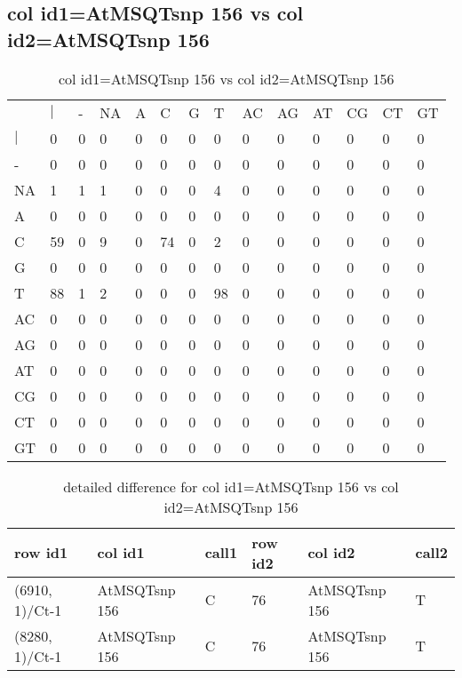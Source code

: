\subsection{col id1=AtMSQTsnp 156 vs col id2=AtMSQTsnp 156}
\begin{center}
\begin{longtable}{|l|l|l|l|l|l|l|l|l|l|l|l|l|l|}
\caption{col id1=AtMSQTsnp 156 vs col id2=AtMSQTsnp 156} \label{table_dm730}\\
\hline
\\
\hline
&$|$&-&NA&A&C&G&T&AC&AG&AT&CG&CT&GT\\
$|$&0&0&0&0&0&0&0&0&0&0&0&0&0\\
-&0&0&0&0&0&0&0&0&0&0&0&0&0\\
NA&1&1&1&0&0&0&4&0&0&0&0&0&0\\
A&0&0&0&0&0&0&0&0&0&0&0&0&0\\
C&59&0&9&0&74&0&2&0&0&0&0&0&0\\
G&0&0&0&0&0&0&0&0&0&0&0&0&0\\
T&88&1&2&0&0&0&98&0&0&0&0&0&0\\
AC&0&0&0&0&0&0&0&0&0&0&0&0&0\\
AG&0&0&0&0&0&0&0&0&0&0&0&0&0\\
AT&0&0&0&0&0&0&0&0&0&0&0&0&0\\
CG&0&0&0&0&0&0&0&0&0&0&0&0&0\\
CT&0&0&0&0&0&0&0&0&0&0&0&0&0\\
GT&0&0&0&0&0&0&0&0&0&0&0&0&0\\
\hline
\end{longtable}
\end{center}

\begin{center}
\begin{longtable}{|l|l|l|l|l|l|}
\caption{detailed difference for col id1=AtMSQTsnp 156 vs col id2=AtMSQTsnp 156} \label{table_dm731}\\
\hline
row id1&col id1&call1&row id2&col id2&call2\\
\hline
(6910, 1)/Ct-1&AtMSQTsnp 156&C&76&AtMSQTsnp 156&T\\
(8280, 1)/Ct-1&AtMSQTsnp 156&C&76&AtMSQTsnp 156&T\\
\hline
\end{longtable}
\end{center}

